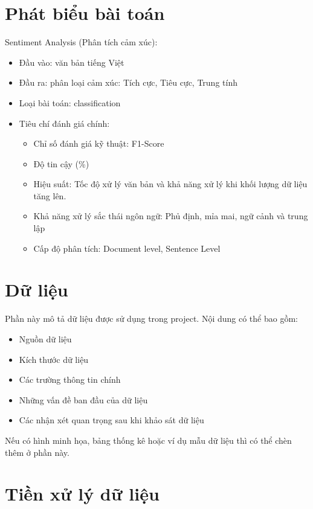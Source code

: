 \documentclass[12pt]{ai_conquer2026}
\begin{document}
\section{Phát biểu bài toán}

Sentiment Analysis (Phân tích cảm xúc):
\begin{itemize}
    \item Đầu vào: văn bản tiếng Việt
    \item Đầu ra: phân loại cảm xúc: Tích cực, Tiêu cực, Trung tính
    \item Loại bài toán: classification
    \item Tiêu chí đánh giá chính:
    \begin{itemize}
        \item Chỉ số đánh giá kỹ thuật: F1-Score
        \item Độ tin cậy (\%)
        \item Hiệu suất: Tốc độ xử lý văn bản và khả năng xử lý khi khối lượng dữ liệu tăng lên.
        \item Khả năng xử lý sắc thái ngôn ngữ: Phủ định, mỉa mai, ngữ cảnh và trung lập
        \item Cấp độ phân tích: Document level, Sentence Level
    \end{itemize}
\end{itemize}


\section{Dữ liệu}

Phần này mô tả dữ liệu được sử dụng trong project. Nội dung có thể bao gồm:
\begin{itemize}
    \item Nguồn dữ liệu
    \item Kích thước dữ liệu
    \item Các trường thông tin chính
    \item Những vấn đề ban đầu của dữ liệu
    \item Các nhận xét quan trọng sau khi khảo sát dữ liệu
\end{itemize}

Nếu có hình minh họa, bảng thống kê hoặc ví dụ mẫu dữ liệu thì có thể chèn thêm ở phần này.

\section{Tiền xử lý dữ liệu}
\end{document}
